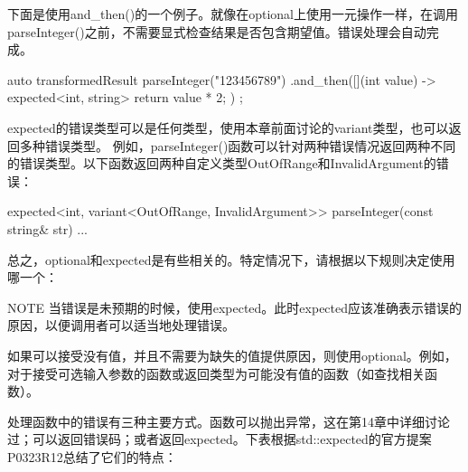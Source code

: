 下面是使用and\_then()的一个例子。就像在optional上使用一元操作一样，在调用parseInteger()之前，不需要显式检查结果是否包含期望值。错误处理会自动完成。

\begin{cpp}
auto transformedResult { parseInteger("123456789")
    .and_then([](int value) -> expected<int, string> { return value * 2; }) };
\end{cpp}

expected的错误类型可以是任何类型，使用本章前面讨论的variant类型，也可以返回多种错误类型。 例如，parseInteger()函数可以针对两种错误情况返回两种不同的错误类型。以下函数返回两种自定义类型OutOfRange和InvalidArgument的错误：


\begin{cpp}
expected<int, variant<OutOfRange, InvalidArgument>>
    parseInteger(const string& str) { ... }
\end{cpp}

总之，optional和expected是有些相关的。特定情况下，请根据以下规则决定使用哪一个：

\begin{myNotic}{NOTE}
当错误是未预期的时候，使用expected。此时expected应该准确表示错误的原因，以便调用者可以适当地处理错误。

如果可以接受没有值，并且不需要为缺失的值提供原因，则使用optional。例如，对于接受可选输入参数的函数或返回类型为可能没有值的函数（如查找相关函数）。
\end{myNotic}


处理函数中的错误有三种主要方式。函数可以抛出异常，这在第14章中详细讨论过；可以返回错误码；或者返回expected。下表根据std::expected的官方提案P0323R12总结了它们的特点：

